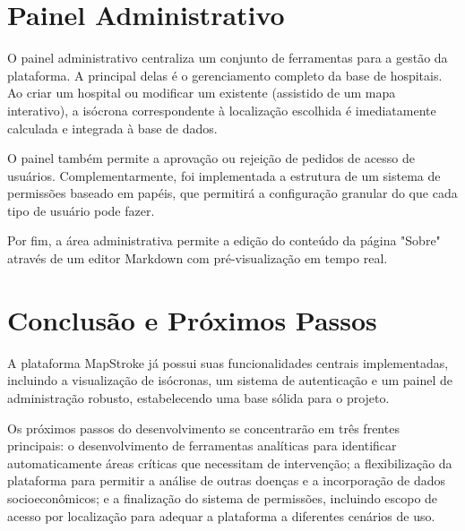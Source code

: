 \documentclass[12pt]{article}
\begin{document}
\section*{Painel Administrativo}

O painel administrativo centraliza um conjunto de ferramentas para a gestão da plataforma. A principal delas é o gerenciamento completo da base de hospitais. Ao criar um hospital ou modificar um existente (assistido de um mapa interativo), a isócrona correspondente à localização escolhida é imediatamente calculada e integrada à base de dados.

O painel também permite a aprovação ou rejeição de pedidos de acesso de usuários. Complementarmente, foi implementada a estrutura de um sistema de permissões baseado em papéis, que permitirá a configuração granular do que cada tipo de usuário pode fazer.

Por fim, a área administrativa permite a edição do conteúdo da página "Sobre" através de um editor Markdown com pré-visualização em tempo real.

\section*{Conclusão e Próximos Passos}

A plataforma MapStroke já possui suas funcionalidades centrais implementadas, incluindo a visualização de isócronas, um sistema de autenticação e um painel de administração robusto, estabelecendo uma base sólida para o projeto.

Os próximos passos do desenvolvimento se concentrarão em três frentes principais: o desenvolvimento de ferramentas analíticas para identificar automaticamente áreas críticas que necessitam de intervenção; a flexibilização da plataforma para permitir a análise de outras doenças e a incorporação de dados socioeconômicos; e a finalização do sistema de permissões, incluindo escopo de acesso por localização para adequar a plataforma a diferentes cenários de uso.
\end{document}

